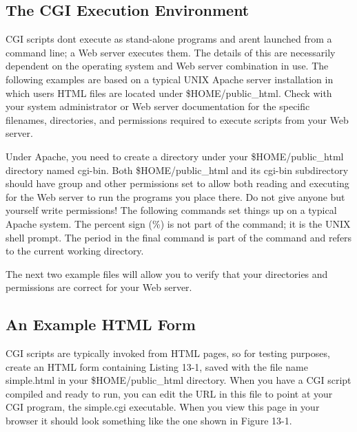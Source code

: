 \subsection{The CGI Execution Environment}
CGI scripts don{\textquotesingle}t execute as stand-alone programs and
aren{\textquotesingle}t launched from a command line; a Web server
executes them. The details of this are necessarily dependent on the
operating system and Web server combination in use. The following
examples are based on a typical UNIX Apache server installation in
which users{\textquotesingle} HTML files are located under
\textsf{\$HOME/public\_html}. Check with your system administrator or
Web server documentation for the specific filenames, directories, and
permissions required to execute scripts from your Web server. 

Under Apache, you need to create a directory under your
\textsf{\$HOME/public\_html} directory named \textsf{cgi-bin}. Both
\textsf{\$HOME/public\_html} and its \textsf{cgi-bin} subdirectory
should have {\textquotedbl}group{\textquotedbl} and
{\textquotedbl}other{\textquotedbl} permissions set to allow both
reading and executing for the Web server to run the programs you place
there. Do not give anyone but yourself write permissions! The following
commands set things up on a typical Apache system. The percent sign
(\textsf{\%}) is not part of the command; it is the UNIX shell prompt.
The period in the final command is part of the command and refers to
the current working directory.


The next two example files will allow you to verify that your
directories and permissions are correct for your Web server.

\subsection{An Example HTML Form}

CGI scripts are typically invoked from HTML pages, so for testing
purposes, create an HTML form containing Listing 13-1, saved with the
file name \textsf{simple.html} in your \textsf{\$HOME/public\_html}
directory. When you have a CGI script compiled and ready to run, you
can edit the URL in this file to point at your CGI program, the
\textsf{simple.cgi} executable. When you view this page in your browser
it should look something like the one shown in Figure 13-1.

